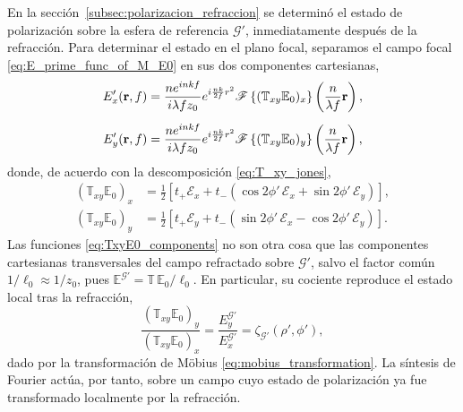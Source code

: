 En la sección~\ref{subsec:polarizacion_refraccion} se determinó el estado
de polarización sobre la esfera de referencia $\mathscr{G}'$, inmediatamente
después de la refracción. Para determinar el estado en el plano focal,
separamos el campo focal \eqref{eq:E_prime_func_of_M_E0} en sus dos
componentes cartesianas,
\begin{equation}
\begin{aligned}
E'_x(\vb r,f)
&=
\frac{n e^{inkf}}{i\lambda f z_0}
e^{i\frac{nk}{2f}r^2}
\mathscr F\left\{(\mathbb{T}_{xy}\mathbb E_0)_x\right\}
\left(\frac{n}{\lambda f}\vb r\right),
\\[0.5em]
E'_y(\vb r,f)
&=
\frac{n e^{inkf}}{i\lambda f z_0}
e^{i\frac{nk}{2f}r^2}
\mathscr F\left\{(\mathbb{T}_{xy}\mathbb E_0)_y\right\}
\left(\frac{n}{\lambda f}\vb r\right),
\end{aligned}
\label{eq:Exy_focal_components}
\end{equation}
donde, de acuerdo con la descomposición \eqref{eq:T_xy_jones},
\begin{equation}
\begin{aligned}
(\mathbb{T}_{xy}\mathbb E_0)_x
&=
\frac{1}{2}
\left[
t_+ \mathscr E_x
+
t_-
\left(
\cos 2\phi'\, \mathscr E_x
+
\sin 2\phi'\, \mathscr E_y
\right)
\right],
\\[0.5em]
(\mathbb{T}_{xy}\mathbb E_0)_y
&=
\frac{1}{2}
\left[
t_+ \mathscr E_y
+
t_-
\left(
\sin 2\phi'\, \mathscr E_x
-
\cos 2\phi'\, \mathscr E_y
\right)
\right].
\end{aligned}
\label{eq:TxyE0_components}
\end{equation}
Las funciones \eqref{eq:TxyE0_components} no son otra cosa que las componentes
cartesianas transversales del campo refractado sobre $\mathscr{G}'$, salvo el
factor común $1/\ell_0 \approx 1/z_0$, pues
$\mathbb E^{\mathscr{G}'}=\mathbb{T}\,\mathbb E_0/\ell_0$. En particular, su
cociente reproduce el estado local tras la refracción,
\begin{equation}
\frac{
(\mathbb{T}_{xy}\mathbb E_0)_y
}{
(\mathbb{T}_{xy}\mathbb E_0)_x
}
=
\frac{
E_y^{\mathscr{G}'}
}{
E_x^{\mathscr{G}'}
}
=
\zeta_{\mathscr{G}'}(\rho',\phi'),
\label{eq:zeta_Gp_ratio}
\end{equation}
dado por la transformación de Möbius \eqref{eq:mobius_transformation}. La
síntesis de Fourier actúa, por tanto, sobre un campo cuyo estado de
polarización ya fue transformado localmente por la refracción.

